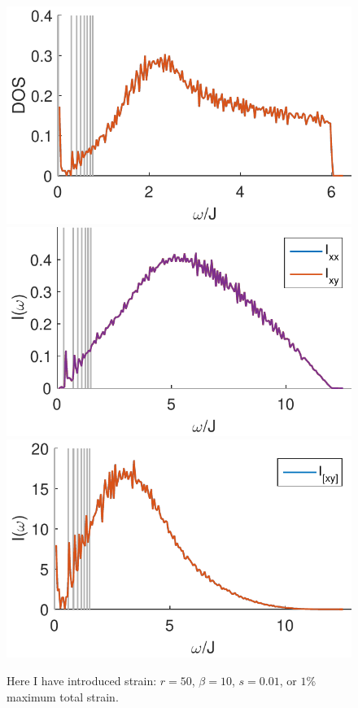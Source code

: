 \documentclass[reprint,amsmath,amssymb,aps,prl,groupedaddress,nofootinbib,superscriptaddress]{revtex4-1}
\newcommand{\1}{\mathds{1}}
\begin{document}
\begin{figure}
	\centering
	\includegraphics[width=0.9\linewidth]{stretch_DOS_rmax_50_b_10_c_10_p_0-eps-converted-to.pdf} 
	\includegraphics[width=0.9\linewidth]{stretch_I2_rmax_50_b_10_c_10_p_0-eps-converted-to.pdf} 
	\includegraphics[width=0.9\linewidth]{stretch_I3_rmax_50_b_10_c_10_p_0-eps-converted-to.pdf}
	\caption{Here I have introduced strain: $r=50$, $\beta=10$, $s=0.01$, or $1$\% maximum total strain. } %
	\label{fig:stretch4}
\end{figure}
\end{document}
